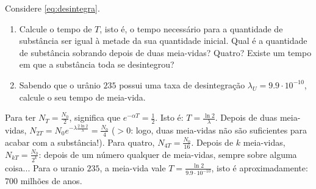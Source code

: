 \begin{exo} Considere \eqref{eq:desintegra}.
\begin{enumerate} 
\item Calcule o tempo de  $T$, isto é, o tempo
necessário para a
quantidade de substância ser igual à metade da sua quantidade inicial.
Qual é a quantidade de substância sobrando depois de duas meia-vidas? Quatro? 
Existe um tempo em que a substância toda se desintegrou?
\item Sabendo que o urânio $235$ possui uma taxa de desintegração
$\lambda_U=9.9\cdot 10^{-10}$, calcule o seu tempo de meia-vida.
\end{enumerate}
\begin{sol}
Para ter $N_T=\tfrac{N_0}{2}$, significa que $e^{-\alpha T}=\tfrac12$. Isto é:
$T=\tfrac{\ln 2}{\lambda}$.
Depois de duas meia-vidas, $N_{2T}=N_0e^{-\lambda\tfrac{2 \ln
2}{\lambda}}=\frac{N_0}{4}$ ($>0$: logo, duas meia-vidas não são suficientes
para acabar com a substância!). 
Para quatro, $N_{4T}=\frac{N_0}{16}$. Depois de $k$ meia-vidas,
$N_{kT}=\frac{N_0}{2^k}$:
depois de um número qualquer de meia-vidas, sempre sobre alguma coisa...
Para o uranio $235$, a meia-vida vale $T=\frac{\ln 2}{9.9\cdot 10^{-10}}$, isto
é aproximadamente: $700$ milhões de anos.
\end{sol}
\end{exo}

